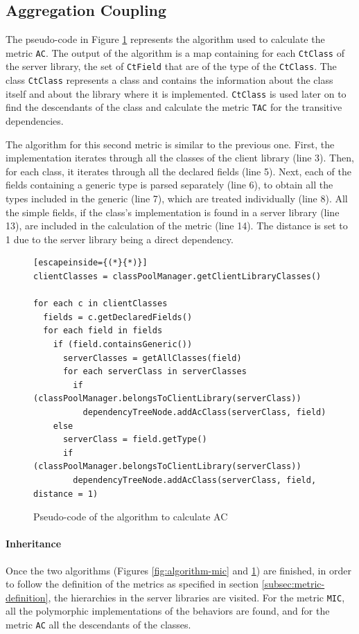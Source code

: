 \subsection{Aggregation Coupling}
The pseudo-code in Figure \ref{fig:algorithm-ac} represents the algorithm used to calculate the metric \texttt{AC}. The output of the algorithm is a map containing for each \texttt{CtClass} of the server library, the set of \texttt{CtField} that are of the type of the \texttt{CtClass}. The class \texttt{CtClass} represents a class and contains the information about the class itself and about the library where it is implemented. \texttt{CtClass} is used later on to find the descendants of the class and calculate the metric \texttt{TAC} for the transitive dependencies.

The algorithm for this second metric is similar to the previous one. First, the implementation iterates through all the classes of the client library (line 3). Then, for each class, it iterates through all the declared fields (line 5). Next, each of the fields containing a generic type is parsed separately (line 6), to obtain all the types included in the generic (line 7), which are treated individually (line 8). All the simple fields, if the class's implementation is found in a server library (line 13), are included in the calculation of the metric (line 14). The distance is set to 1 due to the server library being a direct dependency.

\begin{figure}[ht!]
\begin{lstlisting}[escapeinside={(*}{*)}]
clientClasses = classPoolManager.getClientLibraryClasses()

for each c in clientClasses
  fields = c.getDeclaredFields()
  for each field in fields
    if (field.containsGeneric())
      serverClasses = getAllClasses(field)
      for each serverClass in serverClasses
        if (classPoolManager.belongsToClientLibrary(serverClass))
          dependencyTreeNode.addAcClass(serverClass, field)
    else
      serverClass = field.getType()
      if (classPoolManager.belongsToClientLibrary(serverClass))
        dependencyTreeNode.addAcClass(serverClass, field, distance = 1)
\end{lstlisting}
\caption{Pseudo-code of the algorithm to calculate AC}
\label{fig:algorithm-ac}
\end{figure}

\paragraph{Inheritance}\label{paragraph:inheritance}
Once the two algorithms (Figures \ref{fig:algorithm-mic} and \ref{fig:algorithm-ac}) are finished, in order to follow the definition of the metrics as specified in section \ref{subsec:metric-definition}, the hierarchies in the server libraries are visited. For the metric \texttt{MIC}, all the polymorphic implementations of the behaviors are found, and for the metric \texttt{AC} all the descendants of the classes.

